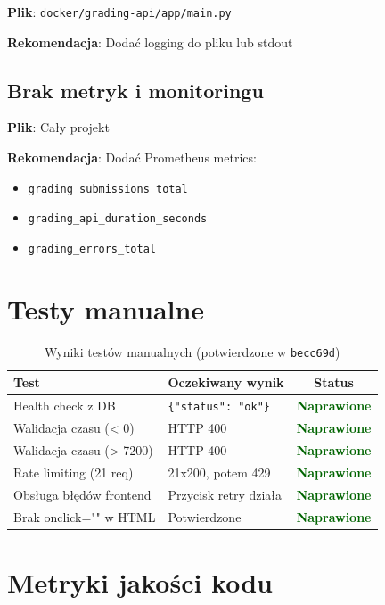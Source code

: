 \documentclass[a4paper,12pt]{article}
\newcommand{\statusok}{\textcolor{darkgreen}{\textbf{Naprawione}}}
\begin{document}
\textbf{Plik}: \texttt{docker/grading-api/app/main.py}

\textbf{Rekomendacja}: Dodać logging do pliku lub stdout

\subsection{Brak metryk i monitoringu}

\textbf{Plik}: Cały projekt

\textbf{Rekomendacja}: Dodać Prometheus metrics:
\begin{itemize}
    \item \texttt{grading\_submissions\_total}
    \item \texttt{grading\_api\_duration\_seconds}
    \item \texttt{grading\_errors\_total}
\end{itemize}

\section{Testy manualne}

\begin{table}[h!]
\centering
\caption{Wyniki testów manualnych (potwierdzone w \texttt{becc69d})}
\label{tab:testy}
\begin{tabular}{llc}
\toprule
\textbf{Test} & \textbf{Oczekiwany wynik} & \textbf{Status} \\
\midrule
Health check z DB & \texttt{\{"status": "ok"\}} & \statusok \\
Walidacja czasu (< 0) & HTTP 400 & \statusok \\
Walidacja czasu (> 7200) & HTTP 400 & \statusok \\
Rate limiting (21 req) & 21x200, potem 429 & \statusok \\
Obsługa błędów frontend & Przycisk retry działa & \statusok \\
Brak onclick="" w HTML & Potwierdzone & \statusok \\
\bottomrule
\end{tabular}
\end{table}

\section{Metryki jakości kodu}
\end{document}
